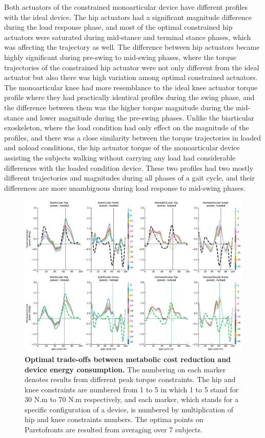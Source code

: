 \documentclass[10pt,letterpaper]{article}
\begin{document}
Both actuators of the constrained monoarticular device have different profiles with the ideal device. The hip actuators had a significant magnitude difference during the load response phase, and most of the optimal constrained hip actuators were saturated during mid-stance and terminal stance phases, which was affecting the trajectory as well. The difference between hip actuators became highly significant during pre-swing to mid-swing phases, where the torque trajectories of the constrained hip actuator were not only different from the ideal actuator but also there was high variation among optimal constrained actuators. The monoarticular knee had more resemblance to the ideal knee actuator torque profile where they had practically identical profiles during the swing phase, and the difference between them was the higher torque magnitude during the mid-stance and lower magnitude during the pre-swing phases. Unlike the biarticular exoskeleton, where the load condition had only effect on the magnitude of the profiles, and there was a close similarity between the torque trajectories in loaded and noload conditions, the hip actuator torque of the monoarticular device assisting the subjects walking without carrying any load had considerable differences with the loaded condition device. These two profiles had two mostly different trajectories and magnitudes during all phases of a gait cycle, and their differences are more unambiguous during load response to mid-swing phases.\\
\begin{figure}[ht]   
	\centering
	\includegraphics[width=\linewidth]{Pareto_Simulations_Figures/PaperFigure_Paretofront_PowerProfiles.pdf}
	\vspace{1mm}
	\caption{{\small\textbf{Optimal trade-offs between metabolic cost reduction and device energy consumption.} The numbering on each marker denotes results from different peak torque constraints. The hip and knee constraints are numbered from 1 to 5 in which 1 to 5 stand for 30 N.m to 70 N.m respectively, and each marker, which stands for a specific configuration of a device, is numbered by multiplication of hip and knee constraints numbers. The optima points on Paretofronts are resulted from averaging over 7 subjects.}}
	\label{Fig_Paretofronts_Power_Profiles}
\end{figure}
\end{document}
